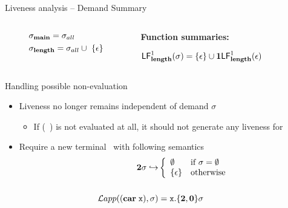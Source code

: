 \documentclass[xcolor=x11names,compress,mathserif]{beamer}
\renewcommand{\(}{\begin{columns}}
\renewcommand{\)}{\end{columns}}
\newcommand{\<}[1]{\begin{column}{#1}}
\renewcommand{\>}{\end{column}}
\begin{document}
\begin{frame}{Liveness analysis -- Demand Summary}
\begin{columns}[c]
\begin{column}[T]{0.30\textwidth}
    \begin{align*}
      &\sigma_{\mathbf{main}} = \sigma_{all}\\
      &\sigma_{\mathbf{length}} = \sigma_{all} \cup\  \{\epsilon\}
    \end{align*}
    
  \end{column}
  \begin{column}[T]{0.38\textwidth}
    \scriptsize
    \centerline{\bf Function summaries:}
    \bigskip
    $\mathsf{LF}_{\mathit {\mathbf{length}}}^{1}( {\mathit \sigma}) = \{\epsilon\} \cup \mathbf{1}\mathsf{LF}_{\mathit {\mathbf{length}}}^{1}( {\mathit \epsilon})$
  \end{column}
\end{columns}
\end{frame}
\begin{frame} {Handling possible non-evaluation}
  \begin{itemize}
  \item Liveness no longer remains independent of demand $\sigma$ \\
    \begin{itemize}
    \item If (\CAR~\px) is not evaluated at all, it should not generate any liveness for \px
    \end{itemize}
  \item Require a new terminal \clazy\ with following semantics
    \begin{align*}
      {\mathbf{2}}\sigma \hookrightarrow & \left\{ 
      \begin{array}{ll}
        \emptyset&\mbox{if}~\sigma = \emptyset\\
        \{\epsilon\} & \mbox{otherwise}
      \end{array}\right.\\ & \\
      \mathcal{L}app((\mbox{$\mathbf{car}$} \;\mbox{\tt x}),\sigma) &= \mbox{\tt x}.\{{\mathbf{2}}, \mathbf{0}\}\sigma
    \end{align*}
  \end{itemize}
\end{frame}
\end{document}

